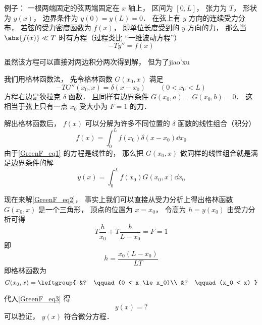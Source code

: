 
\begin{issues}
\issueDraft
\end{issues}


例子： 一根两端固定的弦两端固定在 $x$ 轴上， 区间为 $[0, L]$， 张力为 $T$， 形状为 $y(x)$， 边界条件为 $y(0) = y(L) = 0$． 在弦上有 $y$ 方向的连续受力分布， 若弦的受力密度函数为 $f(x)$， 即单位长度受到的 $y$ 方向的力， 那么当 $\abs{f(x)} \ll T$ 时有方程（过程类比 “一维波动方程”）
\begin{equation}\label{GreenF_eq1}
-T y'' = f(x)
\end{equation}

虽然该方程可以直接对两边积分两次得到解， 但为了jiao'xu

我们用格林函数法， 先令格林函数 $G(x_0, x)$ 满足
\begin{equation}\label{GreenF_eq2}
-T G''(x_0, x) = \delta(x - x_0) \qquad (0 < x_0 < L)
\end{equation}
方程右边是狄拉克 $\delta$ 函数． 且同样有边界条件 $G(x_0, a) = G(x_0, b) = 0$． 这相当于弦上只有一点 $x_0$ 受大小为 $F = 1$ 的力．

解出格林函数后， $f(x)$ 可以分解为许多不同位置的 $\delta$ 函数的线性组合（积分）
\begin{equation}
f(x) = \int_0^L f(x_0) \delta(x - x_0) \dd{x_0}
\end{equation}
由于\autoref{GreenF_eq1} 的方程是线性的， 那么把 $G(x_0, x)$ 做同样的线性组合就是满足边界条件的解
\begin{equation}\label{GreenF_eq3}
y(x) = \int_0^L f(x_0) G(x_0, x) \dd{x_0}
\end{equation}

现在来解\autoref{GreenF_eq2}， 事实上我们可以直接从受力分析上得出格林函数 $G(x_0, x)$ 是一个三角形， 顶点的位置为 $x = x_0$， 令高为 $h = y(x_0)$ 由受力分析可得
\begin{equation}
T\frac{h}{x_0} + T\frac{h}{L - x_0} = F = 1
\end{equation}
即
\begin{equation}
h = \frac{x_0 (L - x_0)}{LT}
\end{equation}
即格林函数为
\begin{equation}
G(x_0, x) = \leftgroup{
&? \qquad (0 < x \le x_0)\\
&? \qquad (x_0 < x)
}\end{equation}

代入\autoref{GreenF_eq3} 得
\begin{equation}
y(x) = ?
\end{equation}
可以验证， $y(x)$ 符合微分方程．
